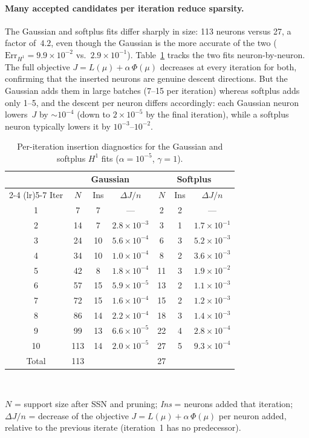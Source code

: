 \documentclass[11pt]{amsart}
\theoremstyle{definition}
\theoremstyle{remark}
\begin{document}
\paragraph{\textbf{Many accepted candidates per iteration reduce sparsity.}}
The Gaussian and softplus fits differ sharply in size: 113 neurons versus 27, a factor of~$4.2$, even though the Gaussian is the more accurate of the two ($\mathrm{Err}_{H^1} = 9.9 \times 10^{-2}$ vs.\ $2.9 \times 10^{-1}$).
Table~\ref{tab:insertion_diag} tracks the two fits neuron-by-neuron.
The full objective $J = L(\mu) + \alpha\,\Phi(\mu)$ decreases at every iteration for both, confirming that the inserted neurons are genuine descent directions.
But the Gaussian adds them in large batches (7--15 per iteration) whereas softplus adds only 1--5, and the descent per neuron differs accordingly: each Gaussian neuron lowers~$J$ by $\sim 10^{-4}$ (down to $2 \times 10^{-5}$ by the final iteration), while a softplus neuron typically lowers it by $10^{-3}$--$10^{-2}$.

\begin{table}[htbp]
\centering
\setlength{\tabcolsep}{10pt}
\renewcommand{\arraystretch}{1.2}
\caption{Per-iteration insertion diagnostics for the Gaussian and softplus $H^1$ fits ($\alpha = 10^{-5}$, $\gamma = 1$).}
\label{tab:insertion_diag}
\begin{tabular}{ccccccc}
\toprule
 & \multicolumn{3}{c}{Gaussian} & \multicolumn{3}{c}{Softplus} \\
\cmidrule(lr){2-4} \cmidrule(lr){5-7}
Iter & $N$ & Ins & $\Delta J / n$ & $N$ & Ins & $\Delta J / n$ \\
\midrule
1  & 7   & 7  & ---                & 2  & 2 & ---                \\
2  & 14  & 7  & $2.8 \times 10^{-3}$ & 3  & 1 & $1.7 \times 10^{-1}$ \\
3  & 24  & 10 & $5.6 \times 10^{-4}$ & 6  & 3 & $5.2 \times 10^{-3}$ \\
4  & 34  & 10 & $1.0 \times 10^{-4}$ & 8  & 2 & $3.6 \times 10^{-3}$ \\
5  & 42  & 8  & $1.8 \times 10^{-4}$ & 11 & 3 & $1.9 \times 10^{-2}$ \\
6  & 57  & 15 & $5.9 \times 10^{-5}$ & 13 & 2 & $1.1 \times 10^{-3}$ \\
7  & 72  & 15 & $1.6 \times 10^{-4}$ & 15 & 2 & $1.2 \times 10^{-3}$ \\
8  & 86  & 14 & $2.2 \times 10^{-4}$ & 18 & 3 & $1.4 \times 10^{-3}$ \\
9  & 99  & 13 & $6.6 \times 10^{-5}$ & 22 & 4 & $2.8 \times 10^{-4}$ \\
10 & 113 & 14 & $2.0 \times 10^{-5}$ & 27 & 5 & $9.3 \times 10^{-4}$ \\
\midrule
Total & 113 & & & 27 & & \\
\bottomrule
\end{tabular}
\\[6pt]
{\small
\raggedright
$N$ = support size after SSN and pruning;\;
\textit{Ins} = neurons added that iteration;\;
$\Delta J / n$ = decrease of the objective $J = L(\mu) + \alpha\,\Phi(\mu)$ per neuron added, relative to the previous iterate (iteration~1 has no predecessor).\par}
\end{table}
\end{document}
